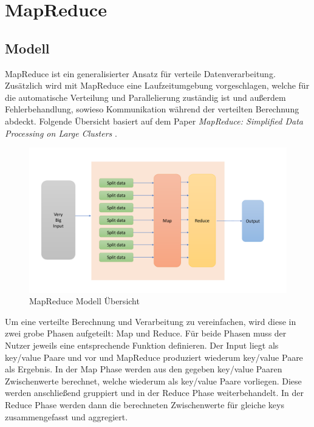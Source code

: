 

\chapter{MapReduce}
\label{MapReduce}


\section{Modell}

MapReduce ist ein generalisierter Ansatz für verteile Datenverarbeitung.
Zusätzlich wird mit MapReduce eine Laufzeitumgebung vorgeschlagen, welche für die automatische Verteilung und Parallelierung zuständig ist und außerdem Fehlerbehandlung, sowieso Kommunikation während der verteilten Berechnung abdeckt.
Folgende Übersicht basiert auf dem Paper \textit{MapReduce: Simplified Data Processing on Large Clusters} \cite{mapReduce}.


\begin{figure}[H]
	\includegraphics[width=\textwidth]{pics/mapReduce/overview}
	\caption{MapReduce Modell Übersicht}
\end{figure}


Um eine verteilte Berechnung und Verarbeitung zu vereinfachen, wird diese in zwei grobe Phasen aufgeteilt: Map und Reduce.
Für beide Phasen muss der Nutzer jeweils eine entsprechende Funktion definieren.
Der Input liegt als key/value Paare und vor und MapReduce produziert wiederum key/value Paare als Ergebnis.
In der Map Phase werden aus den gegeben key/value Paaren Zwischenwerte berechnet, welche wiederum als key/value Paare vorliegen. Diese werden anschließend gruppiert und in der Reduce Phase weiterbehandelt.
In der Reduce Phase werden dann die berechneten Zwischenwerte für gleiche keys zusammengefasst und aggregiert.

